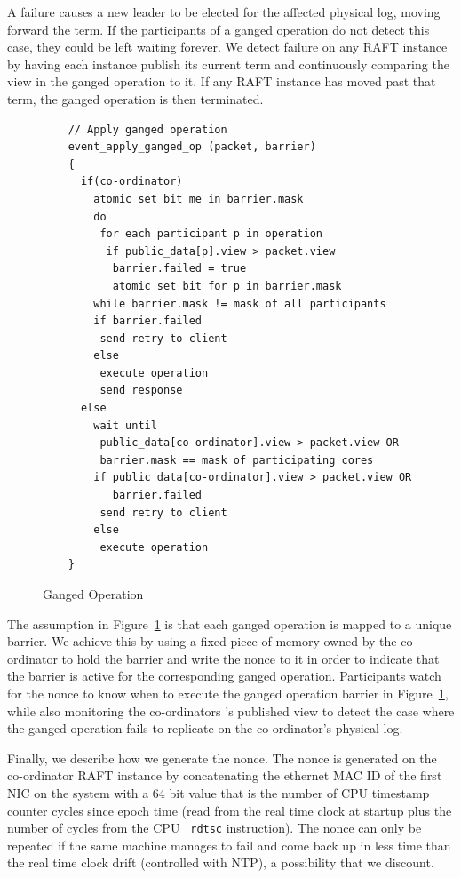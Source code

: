 \documentclass[letterpaper,twocolumn,10pt]{article}
\begin{document}
A failure causes a new leader to be elected for the affected physical log,
moving forward the term. If the participants of a ganged operation do not
detect this case, they could be left waiting forever. We detect failure on any
RAFT instance by having each instance publish its current term and continuously
comparing the view in the ganged operation to it. If any RAFT instance has moved
past that term, the ganged operation is then terminated.

\begin{figure}
  \centering
  \scriptsize
  \bf
\begin{verbatim}
    // Apply ganged operation
    event_apply_ganged_op (packet, barrier)
    {
      if(co-ordinator)
        atomic set bit me in barrier.mask         
        do
         for each participant p in operation
          if public_data[p].view > packet.view
           barrier.failed = true 
           atomic set bit for p in barrier.mask
        while barrier.mask != mask of all participants
        if barrier.failed
         send retry to client
        else       
         execute operation
         send response
      else
        wait until 
         public_data[co-ordinator].view > packet.view OR
         barrier.mask == mask of participating cores
        if public_data[co-ordinator].view > packet.view OR
           barrier.failed
         send retry to client
        else
         execute operation
    }
\end{verbatim}
\caption{Ganged Operation}
\label{fig:ganged_ops}
\end{figure}

The assumption in Figure~\ref{fig:ganged_ops} is that each ganged
operation is mapped to a unique barrier. We achieve this by using a
fixed piece of memory owned by the co-ordinator to hold the barrier
and write the nonce to it in order to indicate that the barrier is
active for the corresponding ganged operation. Participants watch for
the nonce to know when to execute the ganged operation barrier in
Figure~\ref{fig:ganged_ops}, while also monitoring the co-ordinators
's published view to detect the case where the ganged operation fails
to replicate on the co-ordinator's physical log.

Finally, we describe how we generate the nonce. The nonce is generated
on the co-ordinator RAFT instance by concatenating the ethernet MAC ID
of the first NIC on the system with a 64 bit value that is the number
of CPU timestamp counter cycles since epoch time (read from the real
time clock at startup plus the number of cycles from the CPU {\tt
  rdtsc} instruction). The nonce can only be repeated if the same
machine manages to fail and come back up in less time than the real
time clock drift (controlled with NTP), a possibility that we
discount.
\end{document}

